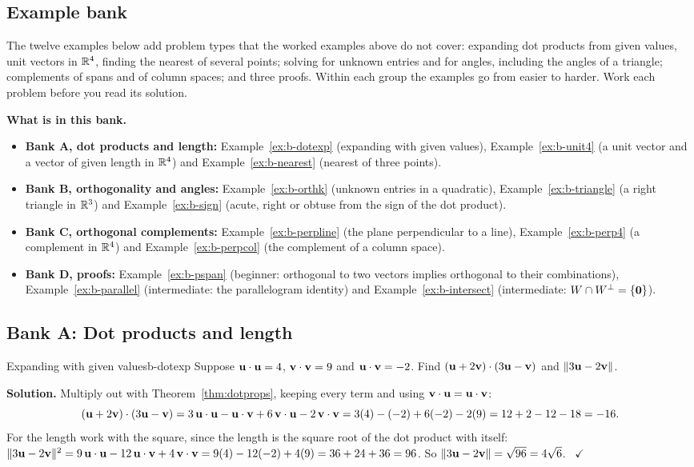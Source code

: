 \documentclass[11pt]{article}
\begin{document}
\subsection*{Example bank}
The twelve examples below add problem types that the worked examples above do not cover: expanding dot products from given values, unit vectors in $\mathbb{R}^4$, finding the nearest of several points; solving for unknown entries and for angles, including the angles of a triangle; complements of spans and of column spaces; and three proofs. Within each group the examples go from easier to harder. Work each problem before you read its solution.

\textbf{What is in this bank.}
\begin{itemize}
  \item \textbf{Bank A, dot products and length:} Example~\ref{ex:b-dotexp} (expanding with given values), Example~\ref{ex:b-unit4} (a unit vector and a vector of given length in $\mathbb{R}^4$) and Example~\ref{ex:b-nearest} (nearest of three points).
  \item \textbf{Bank B, orthogonality and angles:} Example~\ref{ex:b-orthk} (unknown entries in a quadratic), Example~\ref{ex:b-triangle} (a right triangle in $\mathbb{R}^3$) and Example~\ref{ex:b-sign} (acute, right or obtuse from the sign of the dot product).
  \item \textbf{Bank C, orthogonal complements:} Example~\ref{ex:b-perpline} (the plane perpendicular to a line), Example~\ref{ex:b-perp4} (a complement in $\mathbb{R}^4$) and Example~\ref{ex:b-perpcol} (the complement of a column space).
  \item \textbf{Bank D, proofs:} Example~\ref{ex:b-pspan} (beginner: orthogonal to two vectors implies orthogonal to their combinations), Example~\ref{ex:b-parallel} (intermediate: the parallelogram identity) and Example~\ref{ex:b-intersect} (intermediate: $W\cap W^{\perp}=\{\mathbf{0}\}$).
\end{itemize}

\subsection*{Bank A: Dot products and length}
\begin{exmp}{Expanding with given values}{b-dotexp}
Suppose $\mathbf{u}\cdot\mathbf{u}=4$, $\mathbf{v}\cdot\mathbf{v}=9$ and $\mathbf{u}\cdot\mathbf{v}=-2$. Find $(\mathbf{u}+2\mathbf{v})\cdot(3\mathbf{u}-\mathbf{v})$ and $\lVert3\mathbf{u}-2\mathbf{v}\rVert$.

\textbf{Solution.} Multiply out with Theorem~\ref{thm:dotprops}, keeping every term and using $\mathbf{v}\cdot\mathbf{u}=\mathbf{u}\cdot\mathbf{v}$:
\[
(\mathbf{u}+2\mathbf{v})\cdot(3\mathbf{u}-\mathbf{v})=3\,\mathbf{u}\cdot\mathbf{u}-\mathbf{u}\cdot\mathbf{v}+6\,\mathbf{v}\cdot\mathbf{u}-2\,\mathbf{v}\cdot\mathbf{v}=3(4)-(-2)+6(-2)-2(9)=12+2-12-18=-16.
\]
For the length work with the square, since the length is the square root of the dot product with itself: $\lVert3\mathbf{u}-2\mathbf{v}\rVert^2=9\,\mathbf{u}\cdot\mathbf{u}-12\,\mathbf{u}\cdot\mathbf{v}+4\,\mathbf{v}\cdot\mathbf{v}=9(4)-12(-2)+4(9)=36+24+36=96$. So $\lVert3\mathbf{u}-2\mathbf{v}\rVert=\sqrt{96}=4\sqrt6$. \ $\checkmark$
\end{exmp}
\end{document}
